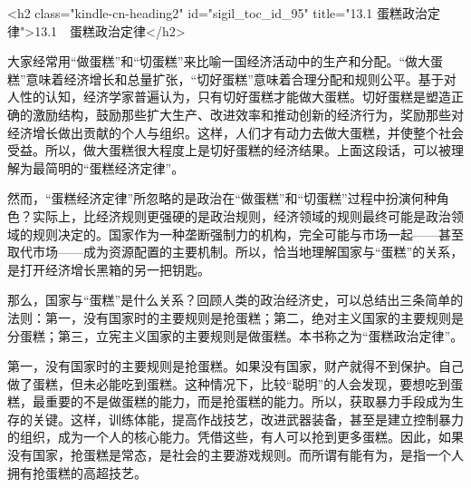 




<h2 class="kindle-cn-heading2" id="sigil_toc_id_95" title="13.1 蛋糕政治定律">13.1　蛋糕政治定律</h2>

大家经常用“做蛋糕”和“切蛋糕”来比喻一国经济活动中的生产和分配。“做大蛋糕”意味着经济增长和总量扩张，“切好蛋糕”意味着合理分配和规则公平。基于对人性的认知，经济学家普遍认为，只有切好蛋糕才能做大蛋糕。切好蛋糕是塑造正确的激励结构，鼓励那些扩大生产、改进效率和推动创新的经济行为，奖励那些对经济增长做出贡献的个人与组织。这样，人们才有动力去做大蛋糕，并使整个社会受益。所以，做大蛋糕很大程度上是切好蛋糕的经济结果。上面这段话，可以被理解为最简明的“蛋糕经济定律”。

然而，“蛋糕经济定律”所忽略的是政治在“做蛋糕”和“切蛋糕”过程中扮演何种角色？实际上，比经济规则更强硬的是政治规则，经济领域的规则最终可能是政治领域的规则决定的。国家作为一种垄断强制力的机构，完全可能与市场一起——甚至取代市场——成为资源配置的主要机制。所以，恰当地理解国家与“蛋糕”的关系，是打开经济增长黑箱的另一把钥匙。

那么，国家与“蛋糕”是什么关系？回顾人类的政治经济史，可以总结出三条简单的法则：第一，没有国家时的主要规则是抢蛋糕；第二，绝对主义国家的主要规则是分蛋糕；第三，立宪主义国家的主要规则是做蛋糕。本书称之为“蛋糕政治定律”。

第一，没有国家时的主要规则是抢蛋糕。如果没有国家，财产就得不到保护。自己做了蛋糕，但未必能吃到蛋糕。这种情况下，比较“聪明”的人会发现，要想吃到蛋糕，最重要的不是做蛋糕的能力，而是抢蛋糕的能力。所以，获取暴力手段成为生存的关键。这样，训练体能，提高作战技艺，改进武器装备，甚至是建立控制暴力的组织，成为一个人的核心能力。凭借这些，有人可以抢到更多蛋糕。因此，如果没有国家，抢蛋糕是常态，是社会的主要游戏规则。而所谓有能有为，是指一个人拥有抢蛋糕的高超技艺。

